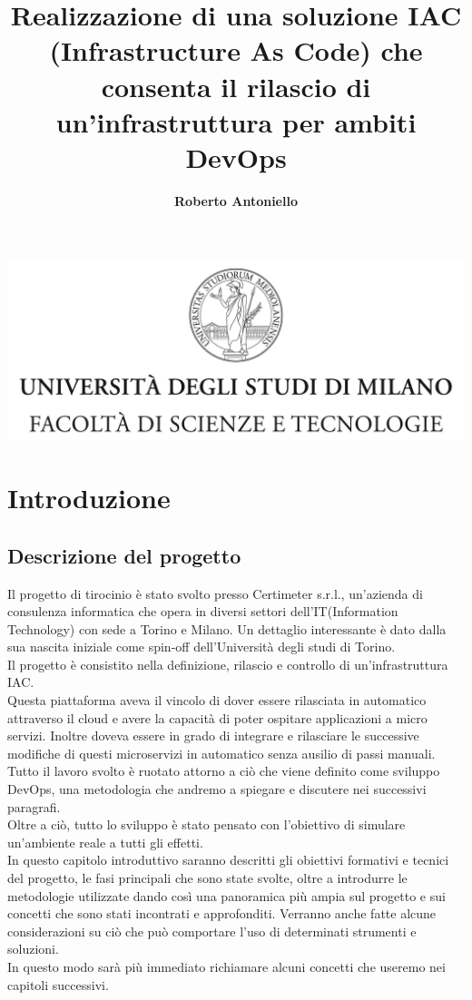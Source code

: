\documentclass[a4paper,12pt]{report}
\begin{document}
\begin{center}
\includegraphics[width=\textwidth]{Logo.jpg}
\title{Realizzazione di una soluzione IAC (Infrastructure As Code) che consenta il rilascio di un'infrastruttura per ambiti DevOps}
\end{center}
\author{\textbf{Roberto Antoniello}}

\beforepreface

\afterpreface
%  
\chapter{Introduzione}
\section{Descrizione del progetto}
Il progetto di tirocinio è stato svolto presso Certimeter s.r.l., un'azienda di consulenza informatica che opera in diversi settori dell'IT(Information Technology) con sede a Torino e Milano. Un dettaglio interessante è dato dalla sua nascita iniziale come spin-off dell'Università degli studi di Torino.\cite{certimeter}\\
Il progetto è consistito nella definizione, rilascio e controllo di un'infrastruttura IAC.\\
Questa piattaforma aveva il vincolo di dover essere rilasciata in automatico attraverso il cloud e avere la capacità di poter ospitare applicazioni a micro servizi. Inoltre doveva essere in grado di integrare e rilasciare le successive modifiche di questi microservizi in automatico senza ausilio di passi manuali.\\
Tutto il lavoro svolto è ruotato attorno a ciò che viene definito come sviluppo DevOps, una metodologia che andremo a spiegare e discutere nei successivi paragrafi. \\
Oltre a ciò, tutto lo sviluppo è stato pensato con l'obiettivo di simulare un'ambiente reale a tutti gli effetti.\\
In questo capitolo introduttivo saranno descritti gli obiettivi formativi e tecnici del progetto, le fasi principali che sono state svolte, oltre a introdurre le metodologie utilizzate dando così una panoramica più ampia sul progetto e sui concetti che sono stati incontrati e approfonditi. 
Verranno anche fatte alcune considerazioni su ciò che può comportare l'uso di determinati strumenti e soluzioni.\\
In questo modo sarà più immediato richiamare alcuni concetti che useremo nei capitoli successivi.
\end{document}
